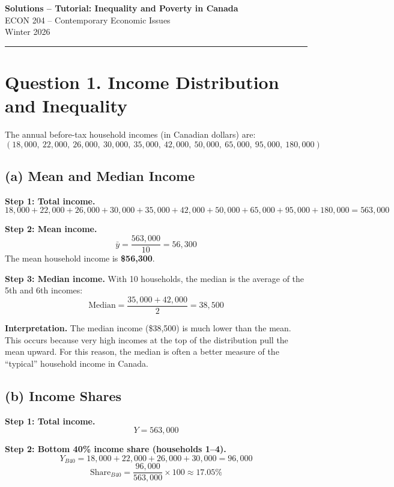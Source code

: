 \documentclass[11pt]{article}
\begin{document}
\begin{center}
{\Large \textbf{Solutions -- Tutorial: Inequality and Poverty in Canada}}\\
\vspace{1em}
{\large ECON 204 -- Contemporary Economic Issues}\\
\vspace{1em}
{\large Winter 2026}
\end{center}
\hrule
\vspace{1em}



\section*{Question 1. Income Distribution and Inequality}

The annual before-tax household incomes (in Canadian dollars) are:
\[
(18{,}000,\ 22{,}000,\ 26{,}000,\ 30{,}000,\ 35{,}000,\ 42{,}000,\ 50{,}000,\ 65{,}000,\ 95{,}000,\ 180{,}000)
\]

\subsection*{(a) Mean and Median Income}

\textbf{Step 1: Total income.}
\[
18{,}000+22{,}000+26{,}000+30{,}000+35{,}000+42{,}000+50{,}000+65{,}000+95{,}000+180{,}000
=563{,}000
\]

\textbf{Step 2: Mean income.}
\[
\bar{y}=\frac{563{,}000}{10}=56{,}300
\]
The mean household income is \textbf{\$56,300}.

\textbf{Step 3: Median income.}  
With 10 households, the median is the average of the 5th and 6th incomes:
\[
\text{Median}=\frac{35{,}000+42{,}000}{2}=38{,}500
\]

\textbf{Interpretation.}  
The median income (\$38,500) is much lower than the mean. This occurs because very high incomes at the top of the distribution pull the mean upward. For this reason, the median is often a better measure of the ``typical'' household income in Canada.

\subsection*{(b) Income Shares}

\textbf{Step 1: Total income.}
\[
Y=563{,}000
\]

\textbf{Step 2: Bottom 40\% income share (households 1--4).}
\[
Y_{B40}=18{,}000+22{,}000+26{,}000+30{,}000=96{,}000
\]
\[
\text{Share}_{B40}=\frac{96{,}000}{563{,}000}\times 100 \approx 17.05\%
\]
\end{document}
